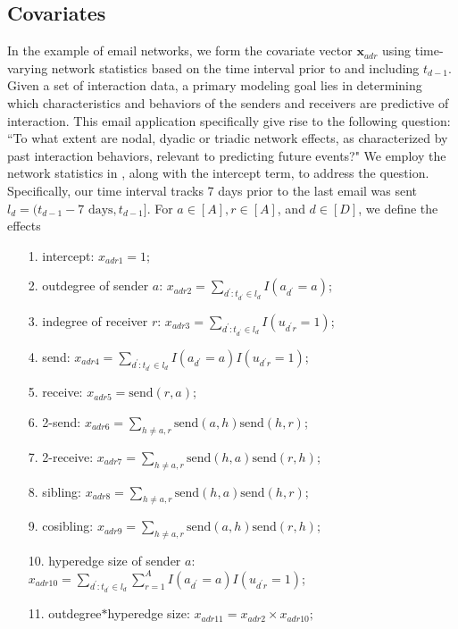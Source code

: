 \documentclass[12pt]{article}
\begin{document}
 	   \subsection{Covariates}\label{subsec:Covariates_email}
	In the example of email networks, we form the covariate vector $\boldsymbol{x}_{adr}$ using time-varying network statistics based on the time interval prior to and including $t_{d-1}$. Given a set of interaction data, a primary modeling goal lies in determining which characteristics and behaviors of the senders and receivers are predictive of interaction. This email application specifically give rise to the following question: ``To what extent are nodal, dyadic or triadic network effects, as characterized
by past interaction behaviors, relevant to predicting future events?" We employ the network statistics in \cite{PerryWolfe2012}, along with the intercept term, to address the question. Specifically, our time interval tracks 7 days prior to the last email was sent $l_d = (t_{d-1}-7\mbox{ days}, t_{d-1}]$. For $a \in [A], r \in [A]$, and $d \in [D]$, we define the effects
	\begin{itemize}
		\item[1.] intercept: ${x}_{adr1} =1$;
		\item[2.] outdegree of sender $a$: ${x}_{adr2} =\sum_{d^\prime: t_{d^\prime} \in l_d} I(a_{d^\prime} = a)$;
		\item[3.] indegree of receiver $r$: ${x}_{adr3}=\sum_{d^\prime: t_{d^\prime} \in l_d} I(u_{d^\prime r} = 1)$;
		\item[4.] send: ${x}_{adr4}=\sum_{d^\prime: t_{d^\prime} \in l_d} I(a_{d^\prime} = a)I(u_{d^\prime r} = 1)$;
		\item[5.] receive: ${x}_{adr5}=\mbox{send}(r,a)$;
		\item[6.] 2-send: ${x}_{adr6} = \sum_{h \neq a, r} \mbox{send}(a,h)\mbox{send}(h,r)$;
		\item[7.] 2-receive: ${x}_{adr7}= \sum_{h \neq a, r} \mbox{send}(h,a)\mbox{send}(r,h)$;
		\item[8.] sibling: ${x}_{adr8}=\sum_{h \neq a, r} \mbox{send}(h,a)\mbox{send}(h,r)$;
		\item[9.] cosibling: ${x}_{adr9}=\sum_{h \neq a, r} \mbox{send}(a,h)\mbox{send}(r,h)$;
		\item[10.] hyperedge size of sender $a$: ${x}_{adr10}=\sum_{d^\prime: t_{d^\prime} \in l_d} \sum_{r=1}^A I(a_{d^\prime} = a)I(u_{d^\prime r} = 1)$;
		\item[11.] outdegree$*$hyperedge size: ${x}_{adr11} = {x}_{adr2}\times{x}_{adr10};$
	\end{itemize}
\end{document}

